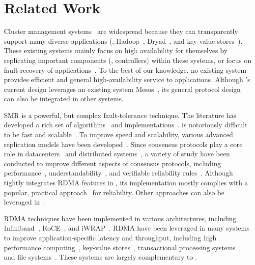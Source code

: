 \section{Related Work} \label{sec:related}

 Cluster management 
systems~\cite{borg:eurosys15,mesos:nsdi11,tupperware,yarn:socc13,
autopilot:sosp07,quincy:sosp09,apollo:osdi14,fuxi:vldb14} are widespread 
because they can transparently support many diverse applications (\eg, 
Hadoop~\cite{hadoop}, Dryad~\cite{dryad}, and key-value stores~\cite{redis}). 
These existing systems mainly focus on high availability for themselves by 
replicating important components (\eg, controllers) within these systems, or 
focus on fault-recovery of applications~\cite{fuxi:vldb14}. To the best of our 
knowledge, no existing system provides efficient and general high-availability 
service to applications. Although \xxx's current design leverages an existing 
system Mesos~\cite{mesos:nsdi11}, its general \paxos protocol design can also 
be integrated in other systems.

  SMR is a powerful, but 
complex fault-tolerance technique. The literature has developed a rich set of
\paxos 
algorithms~\cite{paxos:practical,paxos,paxos:simple,paxos:complex,epaxos:sosp13}
and implementations~\cite{paxos:live,paxos:practical,chubby:osdi}. \paxos is 
notoriously difficult to be fast and scalable~\cite{ellis:thesis}. To improve 
speed and scalability, various advanced replication models have been 
developed~\cite{epaxos:sosp13,mencius:osdi08,scatter:sosp11,manos:hotdep10}. 
Since consensus protocols play a core role in 
datacenters~\cite{matei:hotcloud11, mesos:nsdi11, datacenter:os} and 
distributed 
systems~\cite{spanner:osdi12,mencius:osdi08}, a variety of study have been 
conducted to improve different aspects of consensus protocols, including 
performance~\cite{epaxos:sosp13,paxos:fast,dare:hpdc15}, 
understandability~\cite{raft:usenix14,paxos}, and verifiable reliability 
rules~\cite{modist:nsdi09,demeter:sosp11}. Although \xxx tightly integrates 
RDMA features in \paxos, its implementation mostly complies with a popular, 
practical approach~\cite{paxos:practical} for reliability. Other \paxos 
approaches can also be leveraged in \xxx.

 RDMA techniques have been implemented in various 
architectures, including Infiniband~\cite{infiniband}, RoCE~\cite{roce}, and 
iWRAP~\cite{iwrap}. RDMA have been leveraged in many systems to improve 
application-specific latency and throughput, including high performance 
computing~\cite{openmpi}, key-value 
stores~\cite{pilaf:usenix14,herd:sigcomm14,farm:nsdi14,memcached:rdma}, 
transactional processing systems~\cite{drtm:sosp15,farm:sosp15}, and file 
systems~\cite{gibson:nfs}. These systems are largely complementary to \xxx.
